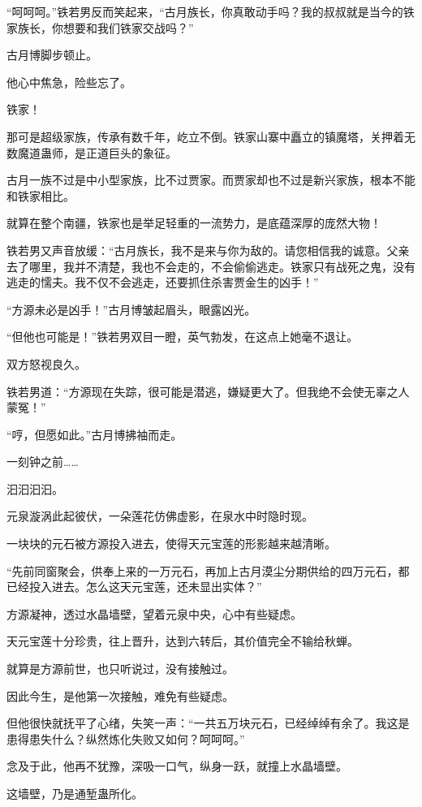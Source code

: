 \begin{this_body}
“呵呵呵。”铁若男反而笑起来，“古月族长，你真敢动手吗？我的叔叔就是当今的铁家族长，你想要和我们铁家交战吗？”

古月博脚步顿止。

他心中焦急，险些忘了。

铁家！

那可是超级家族，传承有数千年，屹立不倒。铁家山寨中矗立的镇魔塔，关押着无数魔道蛊师，是正道巨头的象征。

古月一族不过是中小型家族，比不过贾家。而贾家却也不过是新兴家族，根本不能和铁家相比。

就算在整个南疆，铁家也是举足轻重的一流势力，是底蕴深厚的庞然大物！

铁若男又声音放缓：“古月族长，我不是来与你为敌的。请您相信我的诚意。父亲去了哪里，我并不清楚，我也不会走的，不会偷偷逃走。铁家只有战死之鬼，没有逃走的懦夫。我不仅不会逃走，还要抓住杀害贾金生的凶手！”

“方源未必是凶手！”古月博皱起眉头，眼露凶光。

“但他也可能是！”铁若男双目一瞪，英气勃发，在这点上她毫不退让。

双方怒视良久。

铁若男道：“方源现在失踪，很可能是潜逃，嫌疑更大了。但我绝不会使无辜之人蒙冤！”

“哼，但愿如此。”古月博拂袖而走。

一刻钟之前……

汩汩汩汩。

元泉漩涡此起彼伏，一朵莲花仿佛虚影，在泉水中时隐时现。

一块块的元石被方源投入进去，使得天元宝莲的形影越来越清晰。

“先前同窗聚会，供奉上来的一万元石，再加上古月漠尘分期供给的四万元石，都已经投入进去。怎么这天元宝莲，还未显出实体？”

方源凝神，透过水晶墙壁，望着元泉中央，心中有些疑虑。

天元宝莲十分珍贵，往上晋升，达到六转后，其价值完全不输给秋蝉。

就算是方源前世，也只听说过，没有接触过。

因此今生，是他第一次接触，难免有些疑虑。

但他很快就抚平了心绪，失笑一声：“一共五万块元石，已经绰绰有余了。我这是患得患失什么？纵然炼化失败又如何？呵呵呵。”

念及于此，他再不犹豫，深吸一口气，纵身一跃，就撞上水晶墙壁。

这墙壁，乃是通堑蛊所化。


\end{this_body}
